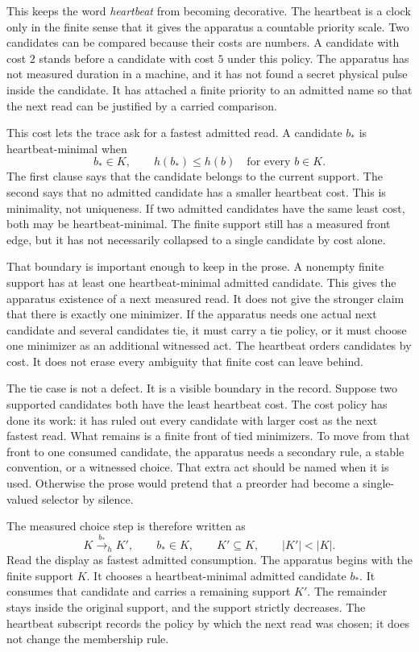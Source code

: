 This keeps the word \emph{heartbeat} from becoming decorative. The heartbeat is a
clock only in the finite sense that it gives the apparatus a countable priority
scale. Two candidates can be compared because their costs are numbers. A
candidate with cost \(2\) stands before a candidate with cost \(5\) under this
policy. The apparatus has not measured duration in a machine, and it has not
found a secret physical pulse inside the candidate. It has attached a finite
priority to an admitted name so that the next read can be justified by a
carried comparison.

This cost lets the trace ask for a fastest admitted read. A candidate
\(b_\ast\) is heartbeat-minimal when
\[
  b_\ast \in K,
  \qquad
  h(b_\ast)\le h(b)
  \quad\text{for every } b\in K .
\]
The first clause says that the candidate belongs to the current support. The
second says that no admitted candidate has a smaller heartbeat cost. This is
minimality, not uniqueness. If two admitted candidates have the same least
cost, both may be heartbeat-minimal. The finite support still has a measured
front edge, but it has not necessarily collapsed to a single candidate by cost
alone.

That boundary is important enough to keep in the prose. A nonempty finite
support has at least one heartbeat-minimal admitted candidate. This gives the
apparatus existence of a next measured read. It does not give the stronger
claim that there is exactly one minimizer. If the apparatus needs one actual
next candidate and several candidates tie, it must carry a tie policy, or it
must choose one minimizer as an additional witnessed act. The heartbeat
orders candidates by cost. It does not erase every ambiguity that finite cost
can leave behind.

The tie case is not a defect. It is a visible boundary in the record. Suppose
two supported candidates both have the least heartbeat cost. The cost policy
has done its work: it has ruled out every candidate with larger cost as the
next fastest read. What remains is a finite front of tied minimizers. To move
from that front to one consumed candidate, the apparatus needs a secondary
rule, a stable convention, or a witnessed choice. That extra act should be
named when it is used. Otherwise the prose would pretend that a preorder had
become a single-valued selector by silence.

The measured choice step is therefore written as
\[
  K \xrightarrow{\,b_\ast\,}_{h} K',
  \qquad
  b_\ast\in K,
  \qquad
  K'\subseteq K,
  \qquad
  |K'|<|K|.
\]
Read the display as fastest admitted consumption. The apparatus begins with
the finite support \(K\). It chooses a heartbeat-minimal admitted candidate
\(b_\ast\). It consumes that candidate and carries a remaining support \(K'\).
The remainder stays inside the original support, and the support strictly
decreases. The heartbeat subscript records the policy by which the next read
was chosen; it does not change the membership rule.

